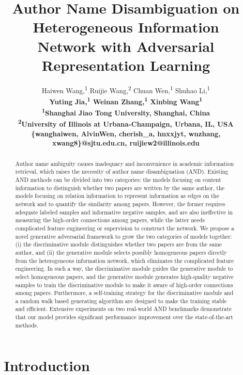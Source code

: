 \documentclass[letterpaper]{article} %
\title{Author Name Disambiguation on Heterogeneous Information Network with Adversarial Representation Learning}
\author{
Haiwen Wang,\textsuperscript{\rm 1} 
Ruijie Wang,\textsuperscript{\rm 2} 
Chuan Wen,\textsuperscript{\rm 1} 
Shuhao Li,\textsuperscript{\rm 1} \\
\bf \Large 
Yuting Jia,\textsuperscript{\rm 1} 
Weinan Zhang,\textsuperscript{\rm 1} 
Xinbing Wang\textsuperscript{\rm 1}  \\
\textsuperscript{\rm 1}Shanghai Jiao Tong University, Shanghai, China\\
\textsuperscript{\rm 2}University of Illinois at Urbana-Champaign, Urbana, IL, USA\\
\{wanghaiwen, AlvinWen, cherish\_a, hnxxjyt, wnzhang, xwang8\}@sjtu.edu.cn, 
ruijiew2@illinois.edu}
\begin{document}
\maketitle

\begin{abstract}

Author name ambiguity causes inadequacy and inconvenience in academic information retrieval, which raises the necessity of author name disambiguation (AND). 
Existing AND methods can be divided into two categories: the models focusing on content information to distinguish whether two papers are written by the same author, the models focusing on relation information to represent information as edges on the network and to quantify the similarity among papers. 
However, the former requires adequate labeled samples and informative negative samples, and are also ineffective in measuring the high-order connections among papers,
while the latter needs complicated feature engineering or supervision to construct the network. 
We propose a novel generative adversarial framework to grow the two categories of models together:
(i) the discriminative module distinguishes whether two papers are from the same author, and (ii)
the generative module selects possibly homogeneous papers directly from the heterogeneous information network, which eliminates the complicated feature engineering.
In such a way, the discriminative module guides the generative module to select homogeneous papers, and the generative module generates high-quality negative samples to train the discriminative module to make it aware of high-order connections among papers.
Furthermore, 
a self-training strategy for the discriminative module and a random walk based generating algorithm are designed to make the training stable and efficient.
Extensive experiments on two real-world AND benchmarks demonstrate that our model provides significant performance improvement over the state-of-the-art  methods.

\end{abstract}

\section{Introduction}
\end{document}

